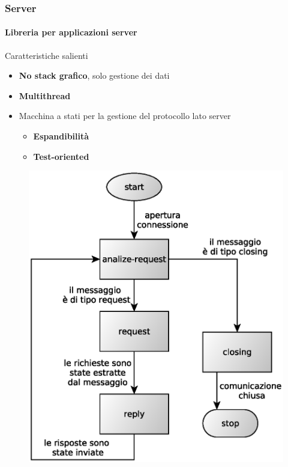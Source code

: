 \documentclass[ignorenonframetext,8pt]{beamer}
\begin{document}
	\begin{frame}
		\frametitle{Server}
		\framesubtitle{Libreria per applicazioni server}
		\begin{block}{Caratteristiche salienti}
			\begin{minipage}[c]{.49\textwidth}
				\begin{itemize}
					\item \textbf{No stack grafico}, solo gestione dei dati
					\item \textbf{Multithread}
					\item Macchina a stati per la gestione del protocollo lato server
						\begin{itemize}
							\item \textbf{Espandibilit\`a}
							\item \textbf{Test-oriented}
						\end{itemize}
				\end{itemize}
			\end{minipage}
			\begin{minipage}[c]{.50\textwidth}
				\begin{figure}
					\includegraphics[width=\textwidth]{Immagini/StateMachineServer}
				\end{figure}
			\end{minipage}
		\end{block}
	\end{frame}
\end{document}
